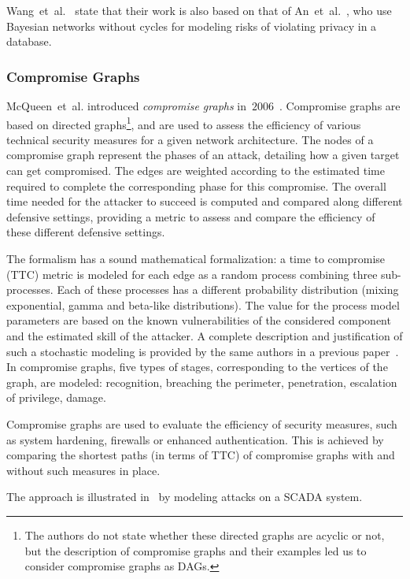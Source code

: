 \documentclass[a4paper]{article}
\begin{document}
Wang~et~al.~\cite{FrWa,FrWaSiJa} state that their work is also based on that
of An~et~al.~\cite{AnJuCe}, who use Bayesian networks without cycles for
modeling risks of violating privacy in a database.

\subsubsection{Compromise Graphs} 
\label{sec:compormise_graphs}

McQueen~et~al. introduced \emph{compromise graphs} in~$2006$~\cite{QuBoFlBe}.
Compromise graphs are based on directed graphs\footnote{The authors do not state
whether these directed graphs are acyclic or not, but the description of
compromise graphs and their examples led us to consider compromise graphs as
DAGs.}, and are used to assess the efficiency of various technical
security measures for a given network architecture. The nodes of a compromise
graph represent the phases of an attack, detailing how a given target can get
compromised. The edges are weighted according to the estimated
time required to complete the corresponding phase for this compromise.
The overall time needed for the attacker to succeed is computed and compared
along different defensive settings, providing a metric to assess and compare
the efficiency of these different defensive settings.

The formalism has a sound mathematical formalization: a time to compromise (TTC)
metric is modeled for each edge as a random process combining three
sub-processes. Each of these processes has a different probability distribution
(mixing exponential, gamma and beta-like distributions). The value for the
process model parameters are based on the known vulnerabilities of the
considered component and the estimated skill of the attacker. A complete
description and justification of such a stochastic modeling is provided by the
same authors in a previous paper~\cite{McQueen2005}. In compromise graphs, five
types of stages, corresponding to the vertices of the graph, are modeled:
recognition, breaching the perimeter, penetration, escalation of privilege,
damage.

Compromise graphs are used to evaluate the efficiency of security measures, 
such as system hardening, firewalls or enhanced authentication. This is achieved
by comparing the shortest paths (in terms of TTC) of compromise graphs with and
without such measures in place. 

The approach is illustrated in~\cite{QuBoFlBe} by modeling attacks on a
SCADA system.
\end{document}
